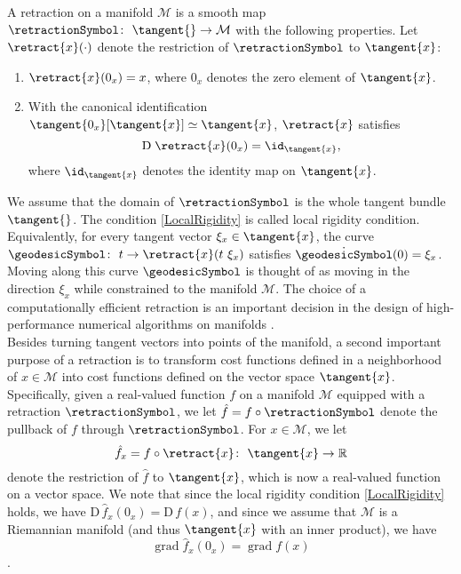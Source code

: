 \begin{definition}\label{Retraction}
    A retraction on a manifold $\mathcal{M}$ is a smooth map $\retractionSymbol \colon \ \tangent{} \to \mathcal{M}$ with the following properties. Let $\retract{x}(\cdot)$ denote the restriction of $\retractionSymbol$ to $\tangent{x}$: 
    \begin{enumerate}
        \item $\retract{x}(0_x) = x$, where $0_x$ denotes the zero element of $\tangent{x}$. 
        \item With the canonical identification $\tangent{0_x}[\tangent{x}] \simeq \tangent{x}$, $\retract{x}$ satisfies \begin{equation} \mathrm{D} \; \retract{x}(0_x) = \id_{\tangent{x}}, \label{LocalRigidity} \end{equation} where $\id_{\tangent{x}}$ denotes the identity map on $\tangent{x}$.  
    \end{enumerate}
\end{definition}
We assume that the domain of $\retractionSymbol$ is the whole tangent bundle $\tangent{}$. The condition \cref{LocalRigidity} is called local rigidity condition. Equivalently, for every tangent vector $\xi_x \in \tangent{x}$, the curve $\geodesicSymbol \colon \ t \to \retract{x}(t \ \xi_x)$ satisfies $\dot{\geodesicSymbol}(0) = \xi_x$. Moving along this curve $\geodesicSymbol$ is thought of as moving in the direction $\xi_x$ while constrained to the manifold $\mathcal{M}$. The choice of a computationally efficient retraction is an important decision in the design of high-performance numerical algorithms on manifolds \cite[p.~54]{AbsilMahonySepulchre:2008}. \\
Besides turning tangent vectors into points of the manifold, a second important purpose of a retraction is to transform cost functions defined in a neighborhood of $x \in \mathcal{M}$ into cost functions defined on the vector space $\tangent{x}$. Specifically, given a real-valued function $f$ on a manifold $\mathcal{M}$ equipped with a retraction $\retractionSymbol$, we let $\hat{f} = f \circ \retractionSymbol$ denote the pullback of $f$ through $\retractionSymbol$. For $x \in \mathcal{M}$, we let
\begin{equation}\label{pullback}
    \hat{f}_x = f \circ \retract{x} \colon \ \tangent{x} \to \mathbb{R}
\end{equation}
denote the restriction of $\hat{f}$ to $\tangent{x}$, which is now a real-valued function on a vector space. We note that since the local rigidity condition \cref{LocalRigidity} holds, we have $\mathrm{D} \, \hat{f}_x (0_x) = \mathrm{D} \, f(x)$, and since we assume that $\mathcal{M}$ is a Riemannian manifold (and thus $\tangent{x}$ with an inner product), we have 
\begin{equation}\label{PullbackGradient}
    \operatorname{grad} \hat{f}_x (0_x) = \operatorname{grad} f(x)
\end{equation}
\cite[p.~54-56]{AbsilMahonySepulchre:2008}.
